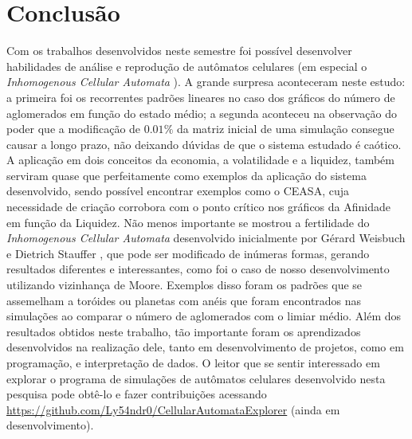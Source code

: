 \documentclass[
	12pt,				%
	openright,			%
	twoside,			%
	a4paper,			%
	english,			%
	french,				%
	spanish,			%
	brazil				%
	]{abntex2}
\begin{document}

\chapter{Conclusão}

Com os trabalhos desenvolvidos neste semestre foi possível desenvolver habilidades de análise e reprodução de autômatos celulares (em especial o \textit{Inhomogenous Cellular Automata} \cite{stauffer}). A grande surpresa aconteceram neste estudo: a primeira foi os recorrentes padrões lineares no caso dos gráficos do número de aglomerados em função do estado médio; a segunda aconteceu na observação do poder que a modificação de $0.01\%$ da matriz inicial de uma simulação consegue causar a longo prazo, não deixando dúvidas de que o sistema estudado é caótico. A aplicação em dois conceitos da economia, a volatilidade e a liquidez, também serviram quase que perfeitamente como exemplos da aplicação do sistema desenvolvido, sendo possível encontrar exemplos como o CEASA, cuja necessidade de criação corrobora com o ponto crítico nos gráficos da Afinidade em função da Liquidez. Não menos importante se mostrou a fertilidade do \textit{Inhomogenous Cellular Automata} desenvolvido inicialmente por Gérard Weisbuch e Dietrich Stauffer \cite{stauffer}, que pode ser modificado de inúmeras formas, gerando resultados diferentes e interessantes, como foi o caso de nosso desenvolvimento utilizando vizinhança de Moore. Exemplos disso foram os padrões que se assemelham a toróides ou planetas com anéis que foram encontrados nas simulações ao comparar o número de aglomerados com o limiar médio. Além dos resultados obtidos neste trabalho, tão importante foram os aprendizados desenvolvidos na realização dele, tanto em desenvolvimento de projetos, como em programação, e interpretação de dados. O leitor que se sentir interessado em explorar o programa de simulações de autômatos celulares desenvolvido nesta pesquisa pode obtê-lo e fazer contribuições acessando \url{https://github.com/Ly54ndr0/CellularAutomataExplorer} (ainda em desenvolvimento).

\postextual
\end{document}
